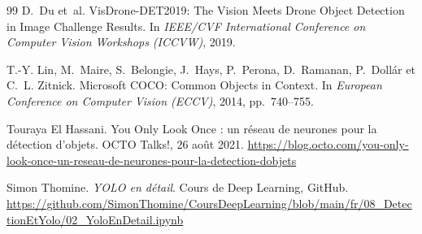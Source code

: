 \documentclass[11pt,a4paper]{article}
\begin{document}
\begin{thebibliography}{99}
D.~Du et~al.
\newblock VisDrone-DET2019: The Vision Meets Drone Object Detection in Image Challenge Results.
\newblock In \emph{IEEE/CVF International Conference on Computer Vision Workshops (ICCVW)}, 2019.

T.-Y. Lin, M.~Maire, S.~Belongie, J.~Hays, P.~Perona, D.~Ramanan, P.~Doll{\'a}r et C.~L. Zitnick.
\newblock Microsoft COCO: Common Objects in Context.
\newblock In \emph{European Conference on Computer Vision (ECCV)}, 2014, pp.~740--755.

Touraya El Hassani.
\newblock You Only Look Once : un réseau de neurones pour la détection d'objets.
\newblock OCTO Talks!, 26 août 2021.
\newblock \url{https://blog.octo.com/you-only-look-once-un-reseau-de-neurones-pour-la-detection-dobjets}

Simon Thomine.
\newblock \textit{YOLO en détail}.
\newblock Cours de Deep Learning, GitHub.
\newblock 
\url{https://github.com/SimonThomine/CoursDeepLearning/blob/main/fr/08_DetectionEtYolo/02_YoloEnDetail.ipynb}
\end{thebibliography}
\end{document}

